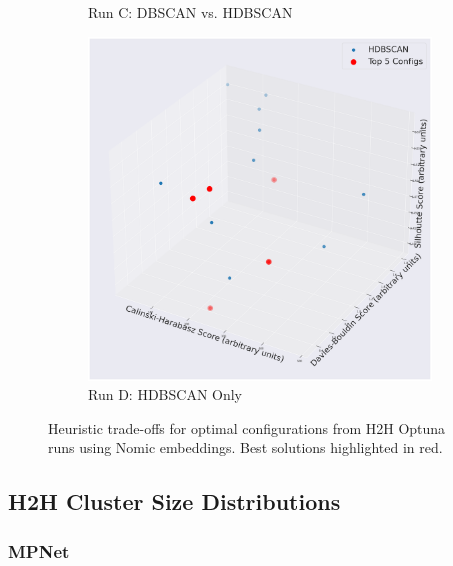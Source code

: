 \documentclass[10pt,oneside]{report}
\begin{document}
\begin{figure}[H]
\begin{subfigure}[b]{0.48\textwidth}
        \caption{Run C: DBSCAN vs. HDBSCAN}
        \label{fig:nomic_dbscan_vs_hdbscan_h2h_config} 
    \end{subfigure}
    \hfill
    \begin{subfigure}[b]{0.48\textwidth}
        \centering
        \includegraphics[width=\textwidth]{./images/nomic_hdbscan.png}
        \caption{Run D: HDBSCAN Only}
        \label{fig:nomic_hdbscan_only_h2h_config} 
    \end{subfigure}
    \caption{Heuristic trade-offs for optimal configurations from H2H Optuna runs using Nomic embeddings. Best solutions highlighted in red.}
    \label{fig:nomic_h2h_config_appendix} %
\end{figure}

\subsection{H2H Cluster Size Distributions}\label{sec:h2h_whisker_appendix}

\subsubsection{MPNet}
\end{document}
